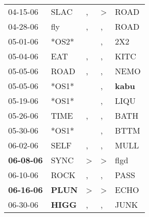 \begin{supertabular}{p{0.07\textwidth}p{0.06\textwidth}p{0.02\textwidth}p{0.02\textwidth}p{0.06\textwidth}}
          04-15-06\textsuperscript{} &           SLAC\textsuperscript{} &                , &     \textgreater &           ROAD\textsuperscript{} \\
          04-28-06\textsuperscript{} &            fly\textsuperscript{} &                , &                , &           ROAD\textsuperscript{} \\
          05-01-06\textsuperscript{} &                            *OS2* &                  &                , &            2X2\textsuperscript{} \\
          05-04-06\textsuperscript{} &            EAT\textsuperscript{} &                , &                , &           KITC\textsuperscript{} \\
          05-05-06\textsuperscript{} &           ROAD\textsuperscript{} &                , &                , &           NEMO\textsuperscript{} \\
          05-05-06\textsuperscript{} &                            *OS1* &                  &                , &  \textbf{kabu\textsuperscript{}} \\
          05-19-06\textsuperscript{} &                            *OS1* &                  &                , &           LIQU\textsuperscript{} \\
          05-26-06\textsuperscript{} &           TIME\textsuperscript{} &                , &                , &           BATH\textsuperscript{} \\
          05-30-06\textsuperscript{} &                            *OS1* &                  &                , &           BTTM\textsuperscript{} \\
          06-02-06\textsuperscript{} &           SELF\textsuperscript{} &                , &                , &           MULL\textsuperscript{} \\
 \textbf{06-08-06\textsuperscript{}} &           SYNC\textsuperscript{} &     \textgreater &     \textgreater &           flgd\textsuperscript{} \\
          06-10-06\textsuperscript{} &           ROCK\textsuperscript{} &                , &                , &           PASS\textsuperscript{} \\
 \textbf{06-16-06\textsuperscript{}} &  \textbf{PLUN\textsuperscript{}} &     \textgreater &     \textgreater &           ECHO\textsuperscript{} \\
          06-30-06\textsuperscript{} &  \textbf{HIGG\textsuperscript{}} &                , &                , &           JUNK\textsuperscript{} \\

\end{supertabular}
